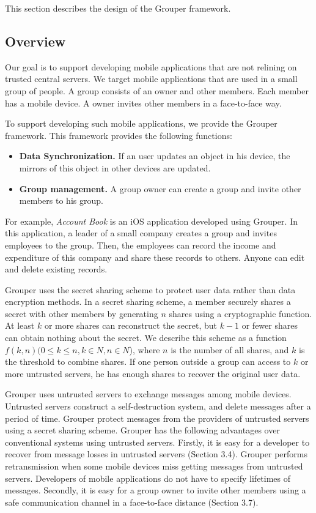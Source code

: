 \documentclass[twocolumn,10pt]{article}
\begin{document}
This section describes the design of the Grouper framework.

\subsection{Overview}

Our goal is to support developing mobile applications that are not relining on trusted central servers.
We target mobile applications that are used in a small group of people.
A group consists of an owner and other members.
Each member has a mobile device.
A owner invites other members in a face-to-face way.

To support developing such mobile applications, we provide the Grouper framework.
This framework provides the following functions:

\begin{itemize}
	\setlength{\itemsep}{1pt}
	\setlength{\parskip}{0pt}
	\setlength{\parsep}{0pt}
	\item \textbf{Data Synchronization.} If an user updates an object in his device, the mirrors of this object in other devices are updated.
	\item \textbf{Group management.} A group owner can create a group and invite other members to his group.
\end{itemize}

For example, \emph{Account Book} is an iOS application developed using Grouper. 
In this application, a leader of a small company creates a group and invites employees to the group. 
Then, the employees can record the income and expenditure of this company and share these records to others.
Anyone can edit and delete existing records.

Grouper uses the secret sharing scheme to protect user data rather than data encryption methods.
In a secret sharing scheme, a member securely shares a secret with other members by generating $n$ shares using a cryptographic function\cite{smith2013layered}. 
At least $k$ or more shares can reconstruct the secret, but $k-1$ or fewer shares can obtain nothing about the secret\cite{pang2005new}. 
We describe this scheme as a function $f(k, n) (0 \leq k \leq n, k \in N, n \in N$), where $n$ is the number of all shares, and $k$ is the threshold to combine shares. 
If one person outside a group can access to $k$ or more untrusted servers, he has enough shares to recover the original user data.

Grouper uses untrusted servers to exchange messages among mobile devices.
Untrusted servers construct a self-destruction system, and delete messages after a period of time.
Grouper protect messages from the providers of untrusted servers using a secret sharing scheme.
Grouper has the following advantages over conventional systems using untrusted servers.
Firstly, it is easy for a developer to recover from message losses in untrusted servers (Section 3.4).
Grouper performs retransmission when some mobile devices miss getting messages from untrusted servers.
Developers of mobile applications do not have to specify lifetimes of messages.
Secondly, it is easy for a group owner to invite other members using a safe communication channel in a face-to-face distance (Section 3.7).
\end{document}
